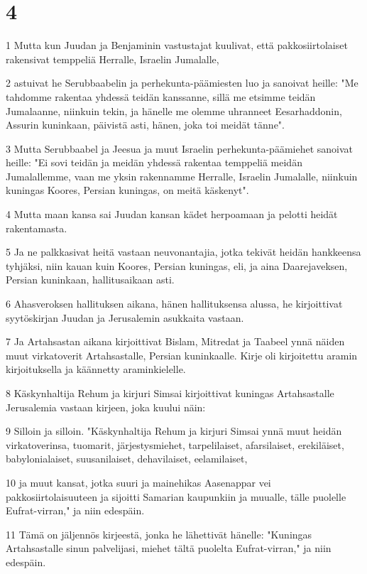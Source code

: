 \chapter{4}

\par 1 Mutta kun Juudan ja Benjaminin vastustajat kuulivat, että pakkosiirtolaiset rakensivat temppeliä Herralle, Israelin Jumalalle,
\par 2 astuivat he Serubbaabelin ja perhekunta-päämiesten luo ja sanoivat heille: "Me tahdomme rakentaa yhdessä teidän kanssanne, sillä me etsimme teidän Jumalaanne, niinkuin tekin, ja hänelle me olemme uhranneet Eesarhaddonin, Assurin kuninkaan, päivistä asti, hänen, joka toi meidät tänne".
\par 3 Mutta Serubbaabel ja Jeesua ja muut Israelin perhekunta-päämiehet sanoivat heille: "Ei sovi teidän ja meidän yhdessä rakentaa temppeliä meidän Jumalallemme, vaan me yksin rakennamme Herralle, Israelin Jumalalle, niinkuin kuningas Koores, Persian kuningas, on meitä käskenyt".
\par 4 Mutta maan kansa sai Juudan kansan kädet herpoamaan ja pelotti heidät rakentamasta.
\par 5 Ja ne palkkasivat heitä vastaan neuvonantajia, jotka tekivät heidän hankkeensa tyhjäksi, niin kauan kuin Koores, Persian kuningas, eli, ja aina Daarejaveksen, Persian kuninkaan, hallitusaikaan asti.
\par 6 Ahasveroksen hallituksen aikana, hänen hallituksensa alussa, he kirjoittivat syytöskirjan Juudan ja Jerusalemin asukkaita vastaan.
\par 7 Ja Artahsastan aikana kirjoittivat Bislam, Mitredat ja Taabeel ynnä näiden muut virkatoverit Artahsastalle, Persian kuninkaalle. Kirje oli kirjoitettu aramin kirjoituksella ja käännetty araminkielelle.
\par 8 Käskynhaltija Rehum ja kirjuri Simsai kirjoittivat kuningas Artahsastalle Jerusalemia vastaan kirjeen, joka kuului näin:
\par 9 Silloin ja silloin. "Käskynhaltija Rehum ja kirjuri Simsai ynnä muut heidän virkatoverinsa, tuomarit, järjestysmiehet, tarpelilaiset, afarsilaiset, erekiläiset, babylonialaiset, suusanilaiset, dehavilaiset, eelamilaiset,
\par 10 ja muut kansat, jotka suuri ja mainehikas Aasenappar vei pakkosiirtolaisuuteen ja sijoitti Samarian kaupunkiin ja muualle, tälle puolelle Eufrat-virran," ja niin edespäin.
\par 11 Tämä on jäljennös kirjeestä, jonka he lähettivät hänelle: "Kuningas Artahsastalle sinun palvelijasi, miehet tältä puolelta Eufrat-virran," ja niin edespäin.
